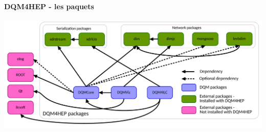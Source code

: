 \documentclass[8pt]{beamer}
\begin{document}
  \begin{frame}
  \frametitle{\backup}
  \framesubtitle{DQM4HEP - les paquets}
    \begin{center}
      \includegraphics[width=\linewidth]{PackagesDiagram.pdf}
    \end{center}
  \end{frame}







\end{document}
